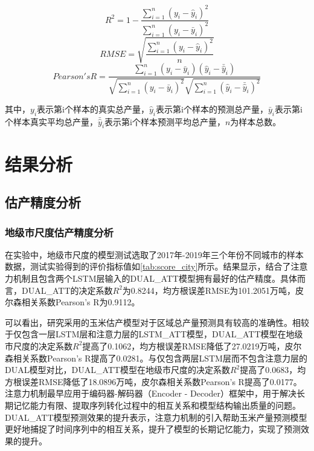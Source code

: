 \begin{equation}
  \label{equ:R2}
  R^2=1-\frac{\sum_{i=1}^n (y_i-\hat{y}_i)^2}{\sum_{i=1}^n (y_i-\bar{y}_i)^2}
\end{equation}
\begin{equation}
  \label{equ:RMSE}
  RMSE=\sqrt{\frac{\sum_{i=1}^n (y_i-\hat{y}_i)^2}{n}}
\end{equation}
\begin{equation}
  \label{equ:Pearson}
  Pearson's R=\frac{\sum_{i=1}^n (y_i-\bar{y}_i)(\hat{y}_i-\bar{\hat{y}}_i)}{\sqrt{\sum_{i=1}^n (y_i-\bar{y}_i)^2}\sqrt{\sum_{i=1}^n (\hat{y}_i-\bar{\hat{y}}_i)^2}}
\end{equation}

\par 其中，$y_i$表示第i个样本的真实总产量，$\hat{y}_i$表示第i个样本的预测总产量，$\bar{y}_i$表示第i个样本真实平均总产量，$\bar{\hat{y}}_i$表示第i个样本预测平均总产量，$n$为样本总数。

\section{结果分析}
\subsection{估产精度分析}
\subsubsection{地级市尺度估产精度分析}

\par 在实验中，地级市尺度的模型测试选取了2017年-2019年三个年份不同城市的样本数据，测试实验得到的评价指标值如\autoref{tab:score_city}所示。结果显示，结合了注意力机制且包含两个LSTM层输入的DUAL\_ATT模型拥有最好的估产精度。具体而言，DUAL\_ATT的决定系数$R^2$为0.8244，均方根误差RMSE为101.2051万吨，皮尔森相关系数Pearson's R为0.9112。

\par 可以看出，研究采用的玉米估产模型对于区域总产量预测具有较高的准确性。相较于仅包含一层LSTM层和注意力层的LSTM\_ATT模型，DUAL\_ATT模型在地级市尺度的决定系数$R^2$提高了0.1062，均方根误差RMSE降低了27.0219万吨，皮尔森相关系数Pearson's R提高了0.0281。与仅包含两层LSTM层而不包含注意力层的DUAL模型对比，DUAL\_ATT模型在地级市尺度的决定系数$R^2$提高了0.0683，均方根误差RMSE降低了18.0896万吨，皮尔森相关系数Pearson's R提高了0.0177。注意力机制最早应用于编码器-解码器（Encoder - Decoder）框架中，用于解决长期记忆能力有限、提取序列转化过程中的相互关系和模型结构输出质量的问题\cite{朱张莉2019注意力机制在深度学习中的研究进展}。DUAL\_ATT模型预测效果的提升表示，注意力机制的引入帮助玉米产量预测模型更好地捕捉了时间序列中的相互关系，提升了模型的长期记忆能力，实现了预测效果的提升。

